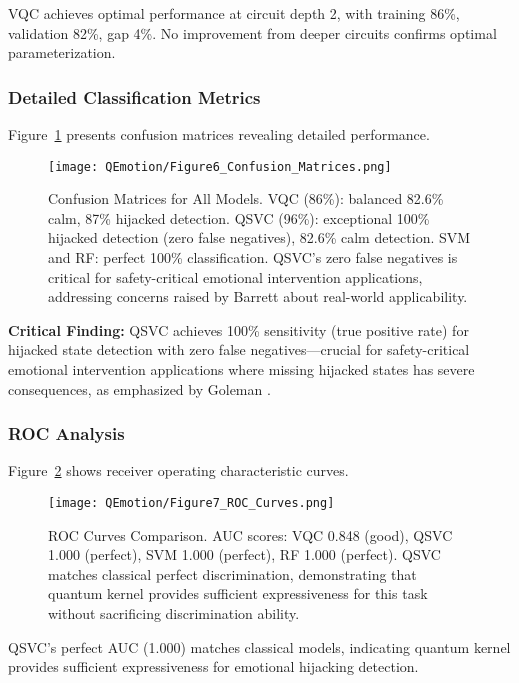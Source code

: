 \documentclass[11pt,letterpaper]{article}
\begin{document}
VQC achieves optimal performance at circuit depth 2, with training 86\%, validation 82\%, gap 4\%. No improvement from deeper circuits confirms optimal parameterization.

\subsubsection{Detailed Classification Metrics}

Figure~\ref{fig:confusion} presents confusion matrices revealing detailed performance.

\begin{figure}[H]
\centering
\texttt{[image: QEmotion/Figure6\_Confusion\_Matrices.png]}
\caption{Confusion Matrices for All Models. VQC (86\%): balanced 82.6\% calm, 87\% hijacked detection. QSVC (96\%): exceptional 100\% hijacked detection (zero false negatives), 82.6\% calm detection. SVM and RF: perfect 100\% classification. QSVC's zero false negatives is critical for safety-critical emotional intervention applications, addressing concerns raised by Barrett \cite{barrett2017emotions} about real-world applicability.}
\label{fig:confusion}
\end{figure}

\textbf{Critical Finding:} QSVC achieves 100\% sensitivity (true positive rate) for hijacked state detection with zero false negatives---crucial for safety-critical emotional intervention applications where missing hijacked states has severe consequences, as emphasized by Goleman \cite{goleman1995emotional}.

\subsubsection{ROC Analysis}

Figure~\ref{fig:roc} shows receiver operating characteristic curves.

\begin{figure}[H]
\centering
\texttt{[image: QEmotion/Figure7\_ROC\_Curves.png]}
\caption{ROC Curves Comparison. AUC scores: VQC 0.848 (good), QSVC 1.000 (perfect), SVM 1.000 (perfect), RF 1.000 (perfect). QSVC matches classical perfect discrimination, demonstrating that quantum kernel \cite{havlicek2019supervised} provides sufficient expressiveness for this task without sacrificing discrimination ability.}
\label{fig:roc}
\end{figure}

QSVC's perfect AUC (1.000) matches classical models, indicating quantum kernel provides sufficient expressiveness for emotional hijacking detection.
\end{document}

